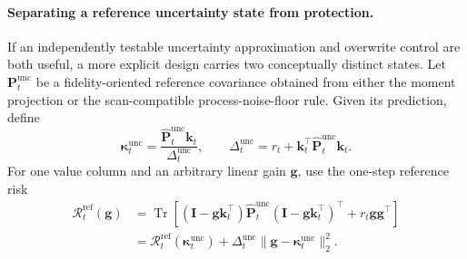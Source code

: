 \documentclass[11pt]{article}
\newcommand{\vct}[1]{\boldsymbol{#1}}
\begin{document}
\paragraph{Separating a reference uncertainty state from protection.}
If an independently testable uncertainty approximation and overwrite control are both useful, a
more explicit design carries two conceptually distinct states. Let
$\vct{P}_t^{\mathrm{unc}}$ be a fidelity-oriented reference covariance obtained from either the
moment projection or the scan-compatible process-noise-floor rule. Given its prediction, define
\begin{equation}
  \vct{\kappa}_t^{\mathrm{unc}}
  =\frac{\widehat{\vct{P}}_t^{\mathrm{unc}}\vct{k}_t}
    {\Delta_t^{\mathrm{unc}}},
  \qquad
  \Delta_t^{\mathrm{unc}}
  =r_t+\vct{k}_t^\top\widehat{\vct{P}}_t^{\mathrm{unc}}\vct{k}_t.
  \label{eq:discussion-calibrated-kalman-gain}
\end{equation}
For one value column and an arbitrary linear gain $\vct{g}$, use the one-step reference risk
\begin{equation}
\begin{aligned}
  \mathcal{R}_t^{\mathrm{ref}}(\vct{g})
  &=
  \operatorname{Tr}\!\left[
    (\vct{I}-\vct{g}\vct{k}_t^\top)
    \widehat{\vct{P}}_t^{\mathrm{unc}}
    (\vct{I}-\vct{g}\vct{k}_t^\top)^\top
    +r_t\vct{g}\vct{g}^\top
  \right] \\
  &=
  \mathcal{R}_t^{\mathrm{ref}}(\vct{\kappa}_t^{\mathrm{unc}})
  +\Delta_t^{\mathrm{unc}}
   \|\vct{g}-\vct{\kappa}_t^{\mathrm{unc}}\|_2^2.
\end{aligned}
  \label{eq:discussion-calibrated-gain-risk}
\end{equation}
\end{document}
